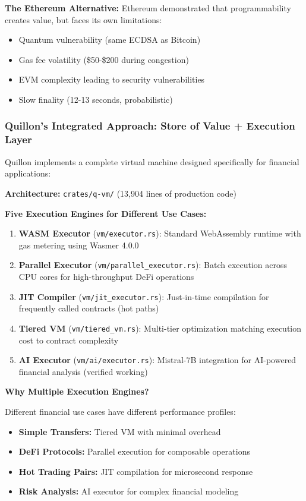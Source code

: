 \documentclass[11pt,a4paper]{article}
\begin{document}
\textbf{The Ethereum Alternative:} Ethereum demonstrated that programmability creates value, but faces its own limitations:
\begin{itemize}[leftmargin=*]
\item Quantum vulnerability (same ECDSA as Bitcoin)
\item Gas fee volatility (\$50-\$200 during congestion)
\item EVM complexity leading to security vulnerabilities
\item Slow finality (12-13 seconds, probabilistic)
\end{itemize}

\subsubsection{Quillon's Integrated Approach: Store of Value + Execution Layer}

Quillon implements a complete virtual machine designed specifically for financial applications:

\textbf{Architecture:} \texttt{crates/q-vm/} (13,904 lines of production code)

\textbf{Five Execution Engines for Different Use Cases:}

\begin{enumerate}[leftmargin=*]
\item \textbf{WASM Executor} (\texttt{vm/executor.rs}): Standard WebAssembly runtime with gas metering using Wasmer 4.0.0

\item \textbf{Parallel Executor} (\texttt{vm/parallel\_executor.rs}): Batch execution across CPU cores for high-throughput DeFi operations

\item \textbf{JIT Compiler} (\texttt{vm/jit\_executor.rs}): Just-in-time compilation for frequently called contracts (hot paths)

\item \textbf{Tiered VM} (\texttt{vm/tiered\_vm.rs}): Multi-tier optimization matching execution cost to contract complexity

\item \textbf{AI Executor} (\texttt{vm/ai/executor.rs}): Mistral-7B integration for AI-powered financial analysis (verified working)
\end{enumerate}

\textbf{Why Multiple Execution Engines?}

Different financial use cases have different performance profiles:
\begin{itemize}[leftmargin=*]
\item \textbf{Simple Transfers:} Tiered VM with minimal overhead
\item \textbf{DeFi Protocols:} Parallel execution for composable operations
\item \textbf{Hot Trading Pairs:} JIT compilation for microsecond response
\item \textbf{Risk Analysis:} AI executor for complex financial modeling
\end{itemize}
\end{document}
